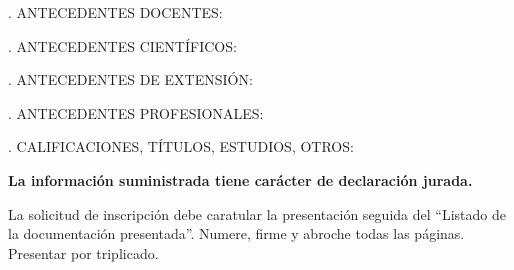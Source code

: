 \documentclass{article}
\begin{document}
\label{begin-docentes}
. ANTECEDENTES DOCENTES:

\bigskip
\noindent 
\label{end-docentes}

\bigskip

\label{begin-cientificos}
. ANTECEDENTES CIENTÍFICOS:

\bigskip
\noindent 
\label{end-cientificos}

\bigskip

\label{begin-extension}
. ANTECEDENTES DE EXTENSIÓN:

\bigskip
\noindent 
\label{end-extension}

\bigskip

\label{begin-profesionales}
. ANTECEDENTES PROFESIONALES:

\bigskip
\noindent 
\label{end-profesionales}

\bigskip

\label{begin-otros}
. CALIFICACIONES, TÍTULOS, ESTUDIOS, OTROS:

\bigskip
\noindent 
\label{end-otros}

\vfill

\begin{center}
{\bf La información suministrada tiene carácter de declaración jurada.

La solicitud de inscripción debe caratular la presentación seguida del ``Listado
de la documentación presentada''. Numere, firme y abroche todas las páginas.
Presentar por triplicado.}
\end{center}
\end{document}
